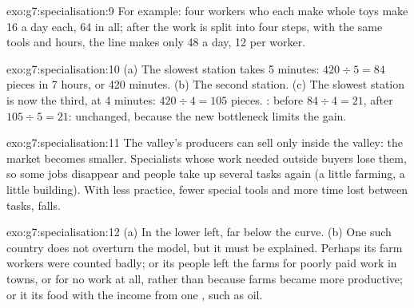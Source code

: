 \begin{solution}{exo:g7:specialisation:9}
For example: four workers who each make whole toys make 16 a day each, 64 in all;
after the work is split into four steps, with the same tools and hours, the line makes
only 48 a day, 12 per worker.
\end{solution}

\begin{solution}{exo:g7:specialisation:10}
(a) The slowest station takes 5 minutes: $420 \div 5 = 84$ pieces in 7 hours, or 420
minutes. (b) The second station. (c) The slowest station is now the third, at 4
minutes: $420 \div 4 = 105$ pieces. : before $84 \div 4 = 21$, after
$105 \div 5 = 21$: unchanged, because the new bottleneck limits the gain.
\end{solution}

\begin{solution}{exo:g7:specialisation:11}
The valley's producers can sell only inside the valley: the market becomes smaller.
Specialists whose work needed outside buyers lose them, so some jobs disappear and
people take up several tasks again (a little farming, a little building). With less
practice, fewer special tools and more time lost between tasks,  falls.
\end{solution}

\begin{solution}{exo:g7:specialisation:12}
(a) In the lower left, far below the curve. (b) One such country does not overturn
the model, but it must be explained. Perhaps its farm workers were counted badly; or
its people left the farms for poorly paid work in towns, or for no work at all, rather
than because farms became more productive; or it  its food with the income from
one , such as oil.
\end{solution}

